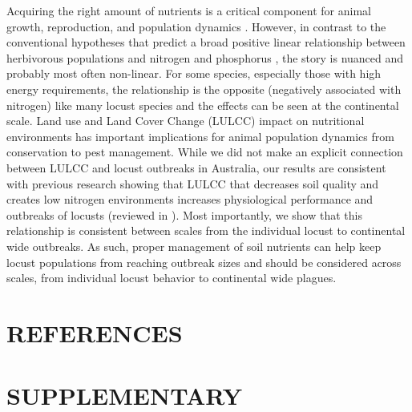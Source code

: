 \documentclass[
]{article}
\begin{document}
Acquiring the right amount of nutrients is a critical component for
animal growth, reproduction, and population dynamics
\citep{doonan_effects_1995, hansson_food_1979, keith_role_1983}.
However, in contrast to the conventional hypotheses that predict a broad
positive linear relationship between herbivorous populations and
nitrogen and phosphorus
\citep{huberty_consequences_2006, mattson_herbivory_1980, white_importance_1978, white_inadequate_1993},
the story is nuanced and probably most often non-linear. For some
species, especially those with high energy requirements, the
relationship is the opposite (negatively associated with nitrogen) like
many locust species and the effects can be seen at the continental
scale. Land use and Land Cover Change (LULCC) impact on nutritional
environments has important implications for animal population dynamics
from conservation to pest management. While we did not make an explicit
connection between LULCC and locust outbreaks in Australia, our results
are consistent with previous research showing that LULCC that decreases
soil quality and creates low nitrogen environments increases
physiological performance and outbreaks of locusts (reviewed in
\citet{le_gall_global_2019}). Most importantly, we show that this
relationship is consistent between scales from the individual locust to
continental wide outbreaks. As such, proper management of soil nutrients
can help keep locust populations from reaching outbreak sizes and should
be considered across scales, from individual locust behavior to
continental wide plagues.

\section{REFERENCES}\label{references}

\renewcommand{\bibsection}{}


\section{SUPPLEMENTARY}\label{supplementary}
\end{document}
